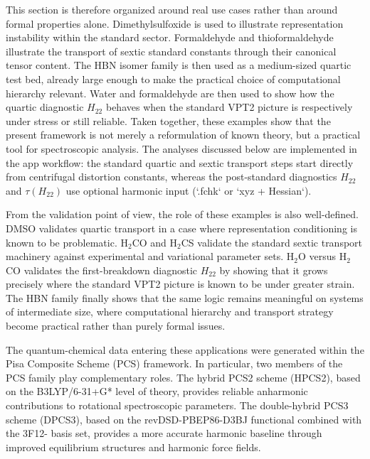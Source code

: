\documentclass[journal=jacsat,manuscript=article]{achemso}
\begin{document}
This section is therefore organized around real use cases rather than around
formal properties alone. Dimethylsulfoxide is used to illustrate
representation instability within the standard sector. Formaldehyde and
thioformaldehyde illustrate the transport of sextic standard constants through
their canonical tensor content. The HBN isomer family is then used as a
medium-sized quartic test bed, already large enough to make the practical
choice of computational hierarchy relevant. Water and formaldehyde are then
used to show how the quartic diagnostic $H_{22}$ behaves when the standard
VPT2 picture is respectively under stress or still reliable. Taken together,
these examples show that the present framework is not merely a reformulation
of known theory, but a practical tool for spectroscopic analysis. The analyses
discussed below are implemented in the app workflow: the standard quartic and
sextic transport steps start directly from centrifugal distortion constants,
whereas the post-standard diagnostics $H_{22}$ and $\tau(H_{22})$ use
optional harmonic input (`.fchk` or `xyz + Hessian`).

From the validation point of view, the role of these examples is also
well-defined. DMSO validates quartic transport in a case where representation
conditioning is known to be problematic. H$_2$CO and H$_2$CS validate the
standard sextic transport machinery against experimental and variational
parameter sets. H$_2$O versus H$_2$CO validates the first-breakdown diagnostic
$H_{22}$ by showing that it grows precisely where the standard VPT2 picture is
known to be under greater strain. The HBN family finally shows that the same
logic remains meaningful on systems of intermediate size, where computational
hierarchy and transport strategy become practical rather than purely formal
issues.

The quantum-chemical data entering these applications were generated within
the Pisa Composite Scheme (PCS) framework. In particular, two members of the
PCS family play complementary roles. The hybrid PCS2 scheme (HPCS2), based on
the B3LYP/6-31+G* level of theory, provides reliable anharmonic contributions
to rotational spectroscopic parameters. The double-hybrid PCS3 scheme
(DPCS3), based on the revDSD-PBEP86-D3BJ functional combined with the 3F12-
basis set, provides a more accurate harmonic baseline through improved
equilibrium structures and harmonic force fields.\cite{pcs1234_2024,DPCS3_2023,BDPCS3_2023}
\end{document}
